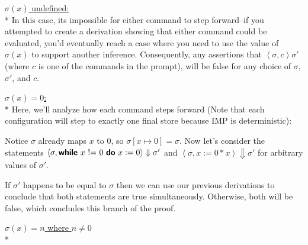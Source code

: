 \documentclass[11pt]{article}
\begin{document}
\begin{exercise}
\begin{enumerate}
\underline{$\sigma(x)$ undefined:} \\*
In this case, its impossible for either command to step forward--if you attempted to create a derivation showing that either command could be evaluated, you'd eventually reach a case where you need to use the value of $\sigma(x)$ to support another inference. Consequently, any assertions that $\left< \sigma, c \right> \sigma'$ (where $c$ is one of the commands in the prompt), will be false for any choice of $\sigma$, $\sigma'$, and $c$.

\underline{$\sigma(x) = 0$:}\\*
Here, we'll analyze how each command steps forward (Note that each configuration will step to exactly one final store because IMP is deterministic):

\begin{prooftree}
\end{prooftree}

\begin{prooftree}
\end{prooftree}

Notice $\sigma$ already maps $x$ to 0, so $\sigma[x \mapsto 0] = \sigma$. Now let's consider the statements  $\left< \sigma, \while{x~\mathord{!}\mathord{=}~0}{x := 0} \right> \Downarrow \sigma'$ and $\left< \sigma, x:= 0 * x \right> \Downarrow \sigma'$ for arbitrary values of $\sigma'$. 

If $\sigma'$ happens to be equal to $\sigma$ then we can use our previous derivations to conclude that both statements are true simultaneously. Otherwise, both will be false, which concludes this branch of the proof.

\underline{$\sigma(x) = n$ where $n \neq 0$} \\*


\end{enumerate}
\end{exercise}
\end{document}
